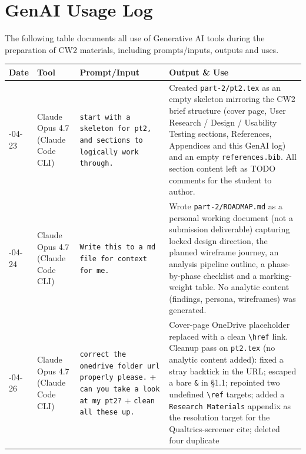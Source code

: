 \documentclass[a4paper,11pt]{article}
\begin{document}
\newpage
\section{GenAI Usage Log}\label{app:genai}

The following table documents all use of Generative AI tools during the
preparation of CW2 materials, including prompts/inputs, outputs and uses.

\vspace{0.5em}
\noindent
\setlength{\emergencystretch}{3em}
\begin{longtable}{@{}>{\raggedright\arraybackslash}p{1.8cm}>{\raggedright\arraybackslash}p{2.8cm}>{\raggedright\arraybackslash}p{4.5cm}>{\raggedright\arraybackslash}p{4.5cm}@{}}
\toprule
\textbf{Date} & \textbf{Tool} & \textbf{Prompt/Input} & \textbf{Output \& Use} \\
\midrule
\endhead
2026-04-23
& Claude Opus 4.7 (Claude Code CLI)
& \texttt{start with a skeleton for pt2, and sections to logically
  work through.}
& Created \texttt{part-2/pt2.tex} as an empty skeleton mirroring the
  CW2 brief structure (cover page, User Research / Design /
  Usability Testing sections, References, Appendices and this
  GenAI log) and an empty \texttt{references.bib}. All section
  content left as TODO comments for the student to author. \\
\midrule
2026-04-24
& Claude Opus 4.7 (Claude Code CLI)
& \texttt{Write this to a md file for context for me.}
& Wrote \texttt{part-2/ROADMAP.md} as a personal working document
  (not a submission deliverable) capturing locked design direction,
  the planned wireframe journey, an analysis pipeline outline, a
  phase-by-phase checklist and a marking-weight table. No analytic
  content (findings, persona, wireframes) was generated. \\
\midrule
2026-04-26
& Claude Opus 4.7 (Claude Code CLI)
& \texttt{correct the onedrive folder url properly please.} +
  \texttt{can you take a look at my pt2?} + \texttt{clean all
  these up.}
& Cover-page OneDrive placeholder replaced with a clean
  \texttt{\textbackslash href} link. Cleanup pass on
  \texttt{pt2.tex} (no analytic content added): fixed a stray
  backtick in the URL; escaped a bare \texttt{\&} in \S1.1;
  repointed two undefined \texttt{\textbackslash ref} targets;
  added a \texttt{Research Materials} appendix as the resolution
  target for the Qualtrics-screener cite; deleted four duplicate

\end{longtable}
\end{document}
